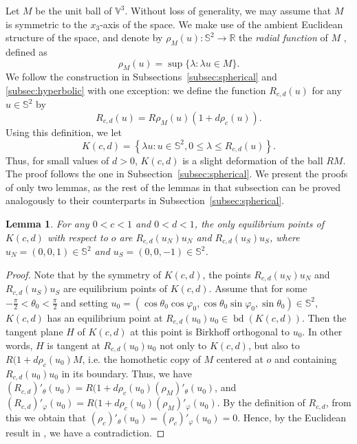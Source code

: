 \documentclass[twoside]{amsart}
\theoremstyle{plain}
\newtheorem{lemma}[theorem]{Lemma}
\theoremstyle{definition}
\numberwithin{equation}{section}
\renewcommand{\Re}{\mathbb R}
\newcommand{\Sph}{\mathbb{S}}
\newcommand{\V}{\mathbb{V}}
\DeclareMathOperator{\bd}{bd}
\begin{document}
Let $M$ be the unit ball of $\V^3$. Without loss of generality, we may assume that $M$ is symmetric to the $x_3$-axis of the space. We make use of the ambient Euclidean structure of the space, and denote by $\rho_M(u) : \Sph^2 \to \Re$ the \emph{radial function} of $M$ \cite{Schneider}, defined as
\[
\rho_M(u) = \sup \{ \lambda: \lambda u \in M \}.
\]
We follow the construction in Subsections~\ref{subsec:spherical} and \ref{subsec:hyperbolic} with one exception: we define the function $R_{c,d}(u)$ for any $u \in \Sph^2$ by
\begin{equation}\label{eq:Rnormed}
R_{c,d}(u) = R \rho_M(u)(1 + d \rho_c(u)).
\end{equation}
Using this definition, we let
\[
K(c,d) = \left\{ \lambda u : u \in \Sph^2, 0 \leq \lambda \leq R_{c,d}(u) \right\}.
\]
Thus, for small values of $d>0$, $K(c,d)$ is a slight deformation of the ball $R M$. The proof follows the one in Subsection~\ref{subsec:spherical}. We present the proofs of only two lemmas, as the rest of the lemmas in that subsection can be proved analogously to their counterparts in Subsection~\ref{subsec:spherical}.

\begin{lemma}\label{lem:equilibrianormed}
For any $0 < c < 1$ and $ 0 < d < 1$, the only equilibrium points of $K(c,d)$ with respect to $o$ are $R_{c,d}(u_N) u_N$ and $R_{c,d}(u_S) u_S$, where $u_N=(0,0,1) \in \Sph^2$ and $u_S=(0,0,-1) \in \Sph^2$.
\end{lemma}

\begin{proof}
Note that by the symmetry of $K(c,d)$, the points $R_{c,d}(u_N) u_N$ and $R_{c,d}(u_S) u_S$ are equilibrium points of $K(c,d)$.
Assume that for some $-\frac{\pi}{2} < \theta_0 < \frac{\pi}{2}$ and setting
$u_0 = (\cos \theta_0 \cos \varphi_0, \cos \theta_0 \sin \varphi_0, \sin \theta_0) \in \Sph^2$,
$K(c,d)$ has an equilibrium point at $R_{c,d}(u_0) u_0 \in \bd(K(c,d))$. Then the tangent plane $H$ of $K(c,d)$ at this point is Birkhoff orthogonal to $u_0$. In other words, $H$ is tangent at $R_{c,d}(u_0) u_0$ not only to $K(c,d)$, but also to $R (1 + d \rho_c(u_0) M$, i.e. the homothetic copy of $M$ centered at $o$ and containing  $R_{c,d}(u_0) u_0$ in its boundary. Thus, we have
$\left(R_{c,d}\right)'_{\theta}(u_0) = R(1 + d \rho_c(u_0) \left( \rho_M \right)'_{\theta}(u_0)$, and $\left(R_{c,d}\right)'_{\varphi}(u_0) = R(1 + d \rho_c(u_0) \left( \rho_M \right)'_{\varphi}(u_0)$.
By the definition of $R_{c,d}$, from this we obtain that $(\rho_c)'_{\theta} (u_0) = (\rho_c)'_{\varphi} (u_0) = 0$. Hence, by the Euclidean result in \cite[Lemma 4]{DLV}, we have a contradiction.
\end{proof}
\end{document}
